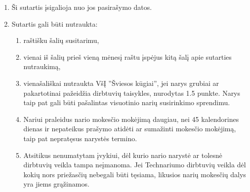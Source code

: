 \documentclass[
  paper=a4,
  fontsize=10pt,
  parskip=full,
  DIV=21,
  BCOR=8mm,
   footinclude=true,
  headheight=2pt,
  footheight=1pt,
  footsepline=true
]{scrartcl}
\begin{document}
\begin{enumerate}
\item Ši sutartis įsigalioja nuo jos pasirašymo datos.
\item Sutartis gali būti nutraukta:
\begin{enumerate}
\item raštišku šalių susitarimu,
\item vienai iš šalių prieš vieną mėnesį raštu įspėjus kitą šalį apie sutarties nutraukimą,
\item vienašališkai nutraukta VšĮ ''Šviesos kūgiai'', jei narys grubiai ar pakartotinai pažeidžia dirbtuvių taisykles, nurodytas 1.5 punkte. Narys taip pat gali būti pašalintas visuotinio narių susirinkimo sprendimu.

\item Nariui praleidus nario mokesčio mokėjimą daugiau, nei 45 kalendorines dienas ir nepateikus prašymo atidėti ar sumažinti mokesčio mokėjimą, taip pat nepratęsus narystės termino.

\item Atsitikus nenumatytam įvykiui, dėl kurio nario narystė ar tolesnė dirbtuvių veikla tampa
neįmanoma. Jei Technariumo dirbtuvių veikla dėl kokių nors priežasčių nebegali būti tęsiama, likusios narių mokesčių dalys yra jiems grąžinamos.
\end{enumerate}  

\end{enumerate} 


\agreementParties
\myfooter

\end{document}

